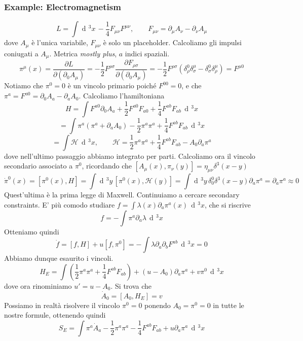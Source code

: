 \documentclass[a4paper, 11pt]{article}
\newcommand{\dd}{\mathop{\mathrm{d}\!}{}}
\newcommand{\pderiv}[2]{\dfrac{\partial #1}{\partial #2}}
\begin{document}
	\subsubsection{Example: Electromagnetism}
	\[ L = \int \dd^3 x\, -\dfrac{1}{4} F_{\mu\nu}F^{\mu\nu},\qquad F_{\mu\nu} = \partial_\mu A_\nu - \partial_\nu A_\mu \]
	dove $A_\mu$ è l'unica variabile, $F_{\mu\nu}$ è solo un placeholder. Calcoliamo gli impulsi coniugati a $A_\mu$. Metrica \emph{mostly plus}, $a$ indici spaziali.
	\[ \pi^\mu (x) = \pderiv{L}{(\partial_0 A_\mu)} = -\dfrac{1}{2} F^{\rho\sigma} \pderiv{F_{\rho\sigma}}{(\partial_0 A_\mu)} = -\dfrac{1}{2} F^{\rho\sigma} (\delta^0_\rho\delta^\mu_\sigma - \delta^0_\sigma\delta^\mu_\rho) = F^{\mu 0} \]
	Notiamo che $\pi^0=0$ è un vincolo primario poiché $F^{00}=0$, e che $\pi^a = F^{a0} = \partial_0 A_a - \partial_a A_0$. Calcoliamo l'hamiltoniana
	\[ H = \int F^{a0} \partial_0 A_a + \dfrac{1}{2} F^{a0}F_{a0} + \dfrac{1}{4} F^{ab}F_{ab}\, \dd^3 x \]
	\[ = \int \pi^a(\pi^a + \partial_a A_0) -\dfrac{1}{2} \pi^a \pi^a + \dfrac{1}{4} F^{ab} F_{ab}\, \dd^3 x \]
	\[ = \int \mathcal{H}\, \dd^3 x,\qquad \mathcal{H} = \dfrac{1}{2} \pi^a \pi^a +\dfrac{1}{4} F^{ab}F_{ab} - A_0 \partial_a \pi^a \]
	dove nell'ultimo passaggio abbiamo integrato per parti. Calcoliamo ora il vincolo secondario associato a $\pi^0$, 
	ricordando che $[A_\mu(x), \pi_\nu (y)] = \eta_{\mu\nu} \delta^3(x-y)$
	\[ \dot{\pi}^0(x) = [\pi^0(x), H] = \int \dd^3 y\, [\pi^0(x), \mathcal{H}(y)] = \int \dd^3 y\, \delta^0_0 \delta^3(x-y) \partial_a \pi^a = \partial_a \pi^a \approx 0 \]
	Quest'ultima è la prima legge di Maxwell.
	Continuiamo a cercare secondary constraints. E' più comodo studiare $f=\int \lambda(x) \partial_a \pi^a(x)\, \dd^3 x$, che si riscrive
	\[ f=-\int \pi^a \partial_a \lambda\, \dd^3 x \]
	Otteniamo quindi
	\[ \dot{f} = [f, H] + u[f, \pi^0] = -\int \lambda \partial_a\partial_b F^{ab}\, \dd^3 x = 0 \]
	Abbiamo dunque esaurito i vincoli.
	\[ H_E = \int \left( \dfrac{1}{2} \pi^a\pi^a + \dfrac{1}{4} F^{ab}F_{ab} \right) + (u-A_0) \partial_a \pi^a + v \pi^0\, \dd^3 x \]
	dove ora rinominiamo $u' = u-A_0$. Si trova che
	\[ \dot{A}_0 = [A_0, H_E] = v \]
	Possiamo in realtà risolvere il vincolo $\pi^0 = 0$ ponendo $A_0 = \pi^0 = 0$ in tutte le nostre formule, ottenendo quindi
	\[ S_E = \int \pi^a \dot{A}_a - \dfrac{1}{2} \pi^a\pi^a -\dfrac{1}{4} F^{ab}F_{ab} + u \partial_a \pi^a\, \dd^3x \]
	
\end{document}
